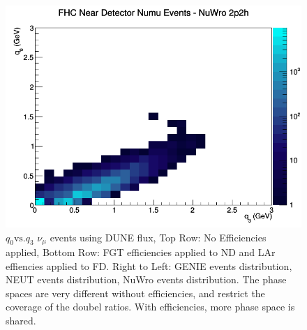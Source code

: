 \documentclass[12pt]{article}
\begin{document}
\begin{figure}[h]
\endminipage
{}
\includegraphics[width=\linewidth]{eff_q0_q3/FGT/2p2h_FHC_ND_numu_q3_q0_NuWro.png}
\endminipage
\caption{$q_0 \textrm{vs.} q_3$ $\nu_{\mu}$ events using DUNE flux, Top Row: No Efficiencies applied, Bottom Row: FGT efficiencies applied to ND and LAr effiencies applied to FD. Right to Left: GENIE events distribution, NEUT events distribution, NuWro events distribution. The phase spaces are very different without efficiencies, and restrict the coverage of the doubel ratios. With efficiencies, more phase space is shared.}
\label{fig:q0q3_numu_2p2h_events}
\end{figure}
\end{document}
